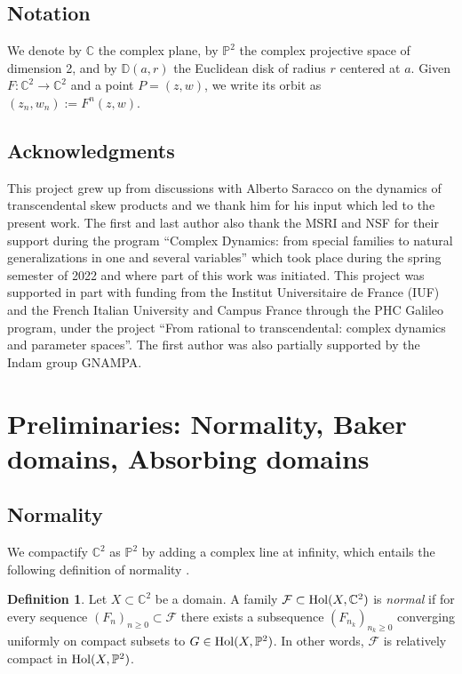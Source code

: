 \documentclass[a4paper, 12pt, twoside]{amsart}
\theoremstyle{definition}
\newtheorem{defn}[thm]{Definition}
\numberwithin{equation}{section}
\newcommand{\C}{{\mathbb C}}
\newcommand{\D}{{\mathbb D}}
\renewcommand{\P}{{\mathbb P}}
\newcommand{\ra}{\rightarrow}
\begin{document}
\subsection*{Notation} We denote by $\C$ the complex plane, by $\P^2$ the complex projective space of dimension 2, and by $\D(a,r)$ the Euclidean disk of radius $r$ centered at $a$. Given $F:\C^2\ra\C^2$ and a point $P=(z,w)$, we write its orbit as  $(z_n, w_n):=F^n(z,w)$.

\subsection*{Acknowledgments} This project grew up from discussions with Alberto Saracco on the dynamics of transcendental skew products and we thank him for his input which led to the present work.
The first and last author also thank the MSRI and NSF for their support during the program ``Complex Dynamics: from special families to natural generalizations in one and several variables'' which took place during the spring semester of 2022 and where part of this work was initiated. This project was supported in part with funding from the Institut Universitaire de France (IUF) and 
the French Italian University and Campus France through the PHC Galileo program, under the project ``From rational to transcendental: complex dynamics and parameter spaces''. The first author was also partially supported by the Indam group GNAMPA.


\section{Preliminaries: Normality, Baker domains, Absorbing domains}\label{preliminaries}

\subsection{Normality}

We  compactify $\C^2$ as $\P^2$ by adding a complex line at infinity, which entails  the following definition of normality \cite{ABFP2019}.

\begin{defn}\label{def:normality}
Let $X\subset \C^2$ be a domain. 
A family $\mathcal{F}\subset {\rm Hol}(X,\C^2)$ is  \emph{normal}  if for every sequence $(F_n)_{n\ge 0}\subset\mathcal{F}$ there exists a subsequence $(F_{n_k})_{n_k\ge 0}$ converging uniformly on compact subsets to $G\in {\rm Hol}(X,\P^2)$.
In other words, $\mathcal{F}$ is  relatively compact in ${\rm Hol}(X,\P^2)$.
\end{defn}
\end{document}
